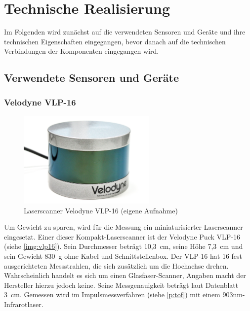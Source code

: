 \documentclass[a4paper,12pt,bibliography=totoc, listof=totoc,titlepage,pointlessnumbers]{scrreprt}
\begin{document}
\chapter{Technische Realisierung}
\label{c:realisierung}


Im Folgenden wird zunächst auf die verwendeten Sensoren und Geräte und ihre technischen Eigenschaften eingegangen, bevor danach auf die technischen Verbindungen der Komponenten eingegangen wird.

\section {Verwendete Sensoren und Geräte}

\subsection{Velodyne VLP-16}
\label{sss:vlp16}

\begin{figure}[!h]
 \centering
 \includegraphics[width=0.6\textwidth]{./img/vlp16.jpg}
 \caption{Laser\-scan\-ner Velodyne VLP-16 (eigene Aufnahme)}
 \label{img:vlp16}
\end{figure}

Um Gewicht zu sparen, wird für die Messung ein miniaturisierter Laser\-scan\-ner eingesetzt. Einer dieser Kompakt-Laser\-scan\-ner ist der Velodyne Puck VLP-16 (siehe \autoref{img:vlp16}). Sein Durchmesser beträgt 10,3~cm, seine Höhe 7,3~cm  und sein Gewicht 830~g ohne Kabel und Schnittstellenbox. Der VLP-16 hat 16 fest ausgerichteten Messstrahlen, die sich zu\-sätz\-lich um die Hochachse drehen. Wahrscheinlich handelt es sich um einen Glasfaser-Scanner, Angaben macht der Hersteller hierzu jedoch keine. Seine Messgenauigkeit beträgt laut Datenblatt 3~cm. Gemessen wird im Impulsmessverfahren (siehe \autoref{p:tof}) mit einem 903nm-Infrarotlaser. \citep{vlpSheet}
\end{document}
